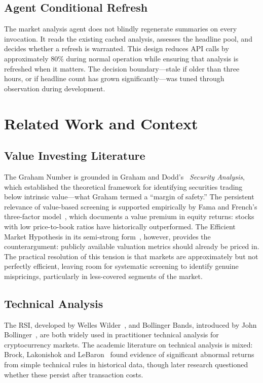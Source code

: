 \documentclass[12pt,a4paper]{article}
\begin{document}
\subsection{Agent Conditional Refresh}

The market analysis agent does not blindly regenerate summaries on every invocation. It reads the existing cached analysis, assesses the headline pool, and decides whether a refresh is warranted. This design reduces API calls by approximately 80\% during normal operation while ensuring that analysis is refreshed when it matters. The decision boundary---stale if older than three hours, or if headline count has grown significantly---was tuned through observation during development.

\section{Related Work and Context}

\subsection{Value Investing Literature}

The Graham Number is grounded in Graham and Dodd's~\cite{graham1934} \textit{Security Analysis}, which established the theoretical framework for identifying securities trading below intrinsic value---what Graham termed a ``margin of safety.'' The persistent relevance of value-based screening is supported empirically by Fama and French's three-factor model~\cite{fama1992}, which documents a value premium in equity returns: stocks with low price-to-book ratios have historically outperformed. The Efficient Market Hypothesis in its semi-strong form~\cite{fama1970}, however, provides the counterargument: publicly available valuation metrics should already be priced in. The practical resolution of this tension is that markets are approximately but not perfectly efficient, leaving room for systematic screening to identify genuine mispricings, particularly in less-covered segments of the market.

\subsection{Technical Analysis}

The RSI, developed by Welles Wilder~\cite{wilder1978}, and Bollinger Bands, introduced by John Bollinger~\cite{bollinger2002}, are both widely used in practitioner technical analysis for cryptocurrency markets. The academic literature on technical analysis is mixed: Brock, Lakonishok and LeBaron~\cite{brock1992} found evidence of significant abnormal returns from simple technical rules in historical data, though later research questioned whether these persist after transaction costs.
\end{document}
